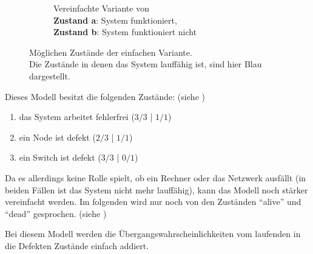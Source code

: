 \documentclass[
            a4paper
            ]{scrartcl}%
\begin{document}
\begin{figure}
\begin{subfigure}[b]{0.48\linewidth}
            \caption{Vereinfachte Variante von  \\
                \textbf{Zustand a}: System funktioniert, \\
                \textbf{Zustand b}: System funktioniert nicht}
            \label{fig:states_simple_mttf_simply}
    \end{subfigure}
    \caption{Möglichen Zustände der einfachen Variante.\\
        Die Zustände in denen das System lauffähig ist, sind hier Blau dargestellt.}
    \label{fig:states_simple_mttf_comb}
\end{figure}

Dieses Modell besitzt die folgenden Zustände: (siehe )
\begin{enumerate}[\bfseries a.]
    \item das System arbeitet fehlerfrei ($3/3$ | $1/1$)
    \item ein Node ist defekt ($2/3$ | $1/1$)
    \item ein Switch ist defekt ($3/3$ | $0/1$)
\end{enumerate}

Da es allerdings keine Rolle spielt, ob ein Rechner oder das Netzwerk ausfällt
(in beiden Fällen ist das System nicht mehr lauffähig), kann das
Modell noch stärker vereinfacht werden. 
Im folgenden wird nur noch von den Zuständen \enquote{alive} und \enquote{dead} gesprochen. 
(siehe )

Bei diesem Modell werden die Übergangswahrscheinlichkeiten vom laufenden in die
Defekten Zustände einfach addiert.
\end{document}
